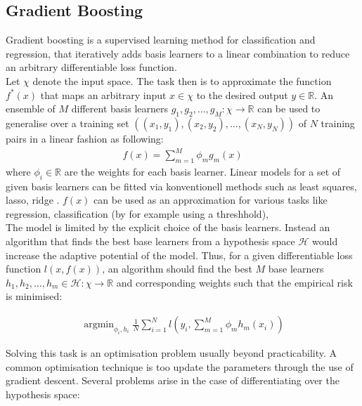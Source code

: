 \documentclass[a4paper, 11pt]{article}
\DeclareMathOperator*{\argmin}{argmin} %
\begin{document}
\subsection{Gradient Boosting}
Gradient boosting is a supervised learning method for classification and regression, that iteratively adds basis learners to a linear combination to reduce an arbitrary differentiable loss function.\\

Let $\chi$ denote the input space. The task then is to approximate the function $f^*(x)$ that maps an arbitrary input $x \in \chi$ to the desired output $y \in \mathbb{R}$. An ensemble of $M$ different basis learners $g_1,g_2,\ldots,g_M: \chi \rightarrow \mathbb{R}$ can be used to generalise over a training set $((x_1, y_1),(x_2,y_2),\ldots,(x_N, y_N))$ of $N$ training pairs in a linear fashion as following:
\begin{align*}
f(x) = \sum_{m=1}^{M}\phi_m g_m(x)
\end{align*}
where $\phi_i \in \mathbb{R}$ are the weights for each basis learner. Linear models for a set of given basis learners can be fitted via konventionell methods such as least squares, lasso, ridge \cite{bishop2006pattern}. $f(x)$ can be used as an approximation for various tasks like regression, classification (by for example using a threshhold), \\

The model is limited by the explicit choice of the basis learners. Instead an algorithm that finds the best base learners from a hypothesis space $\mathcal{H}$ would increase the adaptive potential of the model. Thus, for a given differentiable loss function $l(x, f(x))$, an algorithm should find the best $M$ base learners $h_1, h_2, \ldots, h_m \in \mathcal{H}: \chi \rightarrow \mathbb{R}$ and corresponding weights such that the empirical risk is minimised:

\begin{align}
\argmin_{\phi_i, h_i}\frac{1}{N}\sum_{i = 1}^{N} l(y_i, \sum_{m=1}^{M}\phi_m h_m(x_i))
\end{align}

Solving this task is an optimisation problem usually beyond practicability. A common optimisation technique is too update the parameters through the use of gradient descent. Several problems arise in the case of differentiating over the hypothesis space:
\end{document}
